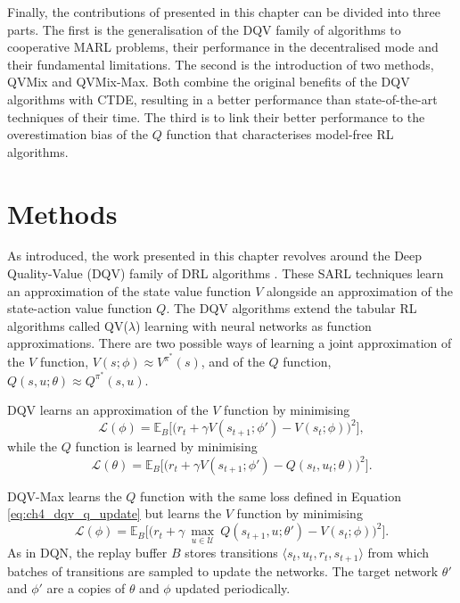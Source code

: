 Finally, the contributions of \citep{leroy2020qvmix} presented in this chapter can be divided into three parts.
The first is the generalisation of the DQV family of algorithms to cooperative MARL problems, their performance in the decentralised mode and their fundamental limitations.
The second is the introduction of two methods, QVMix and QVMix-Max.
Both combine the original benefits of the DQV algorithms with CTDE, resulting in a better performance than state-of-the-art techniques of their time.
The third is to link their better performance to the overestimation bias of the $Q$ function that characterises model-free RL algorithms.

\section{Methods} \label{sec:ch4_methods} 

As introduced, the work presented in this chapter revolves around the Deep Quality-Value (DQV) family of DRL algorithms \citep{sabatelli2018deepQV, sabatelli2020deep}.
These SARL techniques learn an approximation of the state value function $V$ alongside an approximation of the state-action value function $Q$.
The DQV algorithms extend the tabular RL algorithms called QV($\lambda$) learning \citep{wiering2005qv, wiering2009qv} with neural networks as function approximations.
There are two possible ways of learning a joint approximation of the $V$ function, $V(s;\phi)\approx V^{\pi^*}(s)$, and of the $Q$ function, $Q(s, u;\theta)\approx Q^{\pi^*}(s, u)$.

DQV learns an approximation of the $V$ function by minimising
\begin{equation}
    \mathcal{L}(\phi) = \mathbb{E}_{B} \bigg[\big(r_{t} + \gamma V(s_{t+1}; \phi') - V(s_{t}; \phi)\big)^{2}\bigg],
    \label{eq:ch4_dqv_v_update}
\end{equation} 
while the $Q$ function is learned by minimising 
\begin{equation}
    \mathcal{L}(\theta) = \mathbb{E}_{B} \bigg[\big(r_{t} + \gamma V(s_{t+1}; \phi')  - Q(s_{t}, u_{t}; \theta)\big)^{2}\bigg].
\label{eq:ch4_dqv_q_update}
\end{equation}
    
DQV-Max learns the $Q$ function with the same loss defined in Equation \eqref{eq:ch4_dqv_q_update} but learns the $V$ function by minimising
\begin{equation}
        \mathcal{L}(\phi) = \mathbb{E}_{B} \bigg[\big(r_{t} + \gamma \: \underset{u\in \mathcal{U}}{\max}\: Q(s_{t+1}, u; \theta') - V(s_{t}; \phi)\big)^{2}\bigg].
        \label{eq:ch4_dqv_max_v}
\end{equation}
As in DQN, the replay buffer $B$ stores transitions $\langle s_{t},u_{t},r_{t},s_{t+1}\rangle$ from which batches of transitions are sampled to update the networks.
The target network $\theta'$ and $\phi'$ are a copies of $\theta$ and $\phi$ updated periodically.

